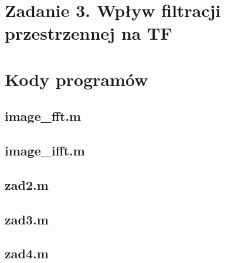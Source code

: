 





 


\section*{Zadanie 3. Wpływ filtracji przestrzennej na TF}







\newpage \section*{Kody programów}

\subsection*{image\_fft.m     }
\subsection*{image\_ifft.m    } \newpage
\subsection*{zad2.m           } \newpage
\subsection*{zad3.m           } \newpage
\subsection*{zad4.m           } \newpage








